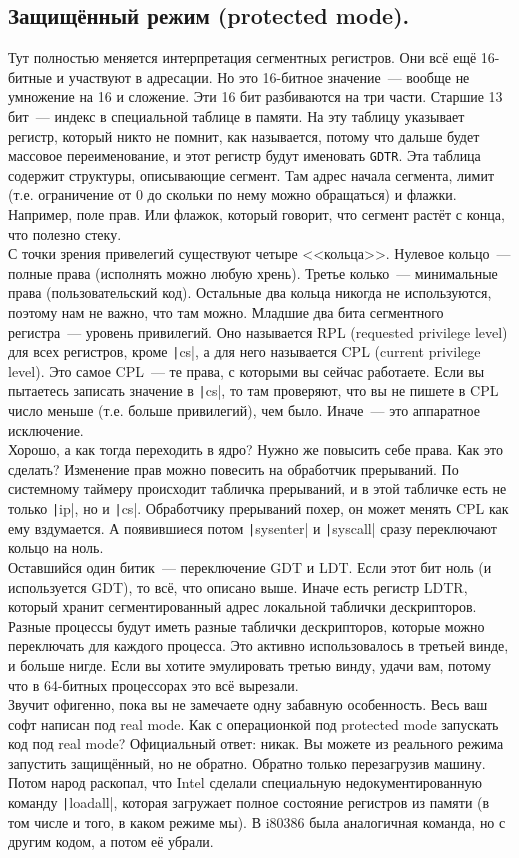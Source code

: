 \documentclass{article}
\begin{document}
    \subsection{Защищённый режим (protected mode).}
    Тут полностью меняется интерпретация сегментных регистров. Они всё ещё 16-битные и участвуют в адресации. Но это 16-битное значение~--- вообще не умножение на 16 и сложение. Эти 16 бит разбиваются на три части. Старшие 13 бит~--- индекс в специальной таблице в памяти. На эту таблицу указывает регистр, который никто не помнит, как называется, потому что дальше будет массовое переименование, и этот регистр будут именовать \Verb|GDTR|. Эта таблица содержит структуры, описывающие сегмент. Там адрес начала сегмента, лимит (т.е. ограничение от 0 до скольки по нему можно обращаться) и флажки. Например, поле прав. Или флажок, который говорит, что сегмент растёт с конца, что полезно стеку.\\
    С точки зрения привелегий существуют четыре <<кольца>>. Нулевое кольцо~--- полные права (исполнять можно любую хрень). Третье колько~--- минимальные права (пользовательский код). Остальные два кольца никогда не используются, поэтому нам не важно, что там можно. Младшие два бита сегментного регистра~--- уровень привилегий. Оно называется RPL (requested privilege level) для всех регистров, кроме \texttt|cs|, а для него называется CPL (current privilege level). Это самое CPL~--- те права, с которыми вы сейчас работаете. Если вы пытаетесь записать значение в \texttt|cs|, то там проверяют, что вы не пишете в CPL число меньше (т.е. больше привилегий), чем было. Иначе~--- это аппаратное исключение.\\
    Хорошо, а как тогда переходить в ядро? Нужно же повысить себе права. Как это сделать? Изменение прав можно повесить на обработчик прерываний. По системному таймеру происходит табличка прерываний, и в этой табличке есть не только \texttt|ip|, но и \texttt|cs|. Обработчику прерываний похер, он может менять CPL как ему вздумается. А появившиеся потом \texttt|sysenter| и \texttt|syscall| сразу переключают кольцо на ноль.\\
    Оставшийся один битик~--- переключение GDT и LDT. Если этот бит ноль (и используется GDT), то всё, что описано выше. Иначе есть регистр LDTR, который хранит сегментированный адрес локальной таблички дескрипторов. Разные процессы будут иметь разные таблички дескрипторов, которые можно переключать для каждого процесса. Это активно использовалось в третьей винде, и больше нигде. Если вы хотите эмулировать третью винду, удачи вам, потому что в 64-битных процессорах это всё вырезали.\\
    Звучит офигенно, пока вы не замечаете одну забавную особенность. Весь ваш софт написан под real mode. Как с операционкой под protected mode запускать код под real mode? Официальный ответ: никак. Вы можете из реального режима запустить защищённый, но не обратно. Обратно только перезагрузив машину. Потом народ раскопал, что Intel сделали специальную недокументированную команду \texttt|loadall|, которая загружает полное состояние регистров из памяти (в том числе и того, в каком режиме мы). В i80386 была аналогичная команда, но с другим кодом, а потом её убрали.
\end{document}
